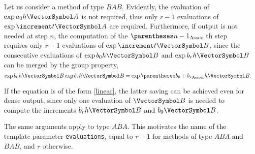 \documentclass[10pt, a4paper, twoside]{basestyle}
\begin{document}
Let us consider a method of type $BAB$. 
Evidently, the evaluation of $\exp a_0h\vA$
is not required, thus only $r-1$ evaluations of  $\exp \increment t\vA$ are
required.
Furthermore, if output is not needed at step $n$, the computation of
the $\pa{n-1}$th step requires only $r-1$ evaluations of
$\exp \increment t\vB$, since the consecutive evaluations of $\exp b_0h\vB$
and $\exp b_rh\vB$ can be merged by the group property,\[
\exp b_0h\vB\exp b_rh\vB=\exp \pa{b_0+b_r}h\vB\text.
\]

If the equation is of the form \ref{linear}, the latter saving can be achieved even
for dense output, since only one evaluation of $\vB$ is needed to compute the
increments $b_rh\vB$ and $b_0\vB$.

The same arguments apply to type $ABA$.
This motivates the name of the template
parameter \texttt{evaluations}, equal to $r-1$ for methods of type $ABA$ and
$BAB$, and $r$ otherwise.
\end{document}
